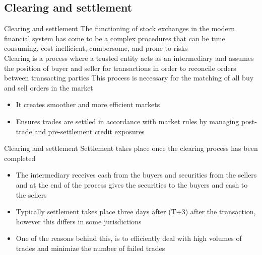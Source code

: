 \documentclass[9pt]{beamer}
\begin{document}
%

\subsection{Clearing and settlement}

\begin{frame}{Clearing and settlement}
	The functioning of stock exchanges in the modern financial system has come to be a complex procedures that can be time consuming, cost inefficient, cumbersome, and prone to risks\\ \vspace{3mm}
	Clearing is a process where a trusted entity acts as an intermediary and assumes the position of buyer and seller for transactions in order to reconcile orders between transacting parties
	This process is necessary for the matching of all buy and sell orders in the market
	\begin{itemize}
		\item It creates smoother and more efficient markets
		\item Ensures trades are settled in accordance with market rules by managing post-trade and pre-settlement credit exposures
	\end{itemize}
\end{frame}


\begin{frame}{Clearing and settlement}
	Settlement takes place once the clearing process has been completed
	\begin{itemize}
		\item The intermediary receives cash from the buyers and securities from the sellers and at the end of the process gives the securities to the buyers and cash to the sellers
		\item Typically settlement takes place three days after (T+3) after the transaction, however this differs in some jurisdictions
		\item One of the reasons behind this, is to efficiently deal with high volumes of trades and minimize the number of failed trades
	\end{itemize}
\end{frame}

\end{document}
